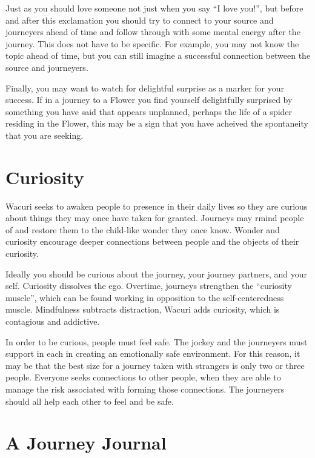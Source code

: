 \documentclass[12pt]{book}
\begin{document}
Just as you should love someone not just when you
say ``I love you!'', but before and after this
exclamation you should try to connect to your
source and journeyers ahead of time and follow
through with some mental energy after the journey.
This does not have to be specific. For example,
you may not know the topic ahead of time, but
you can still imagine a successful connection
between the source and journeyers.


Finally, you may want to watch for
delightful surprise as a marker for your
success. If in a journey to a Flower you
find yourself delightfully surprised by
something you have said that appears unplanned,
perhaps the life of a spider residing in the
Flower, this may be a sign that you have
acheived the spontaneity that you are seeking.





\chapter{Curiosity}

Wacuri seeks to awaken people to presence in their daily
lives so they are curious about things they may once have taken for
granted. Journeys may rmind people of and restore them to the child-like
wonder they once know. Wonder and curiosity encourage deeper connections
between people and the objects of their curiosity.

Ideally you should be curious about the journey, your journey partners,
and your self. Curiosity dissolves the ego. Overtime, journeys strengthen the ``curiosity muscle'',
which can be found working in opposition to the self-centeredness muscle.
Mindfulness subtracts distraction, Wacuri adds curiosity, which is contagious and addictive.

In order to be curious, people must feel safe. The jockey and the journeyers must
support in each in creating an emotionally safe environment. For this reason, it
may be that the best size for a journey taken with strangers is only two or three people.
Everyone seeks connections to other people, when they are able to manage the risk associated with
forming those connections. The journeyers should all help each other to feel and be safe.

\chapter{A Journey Journal}
\end{document}
